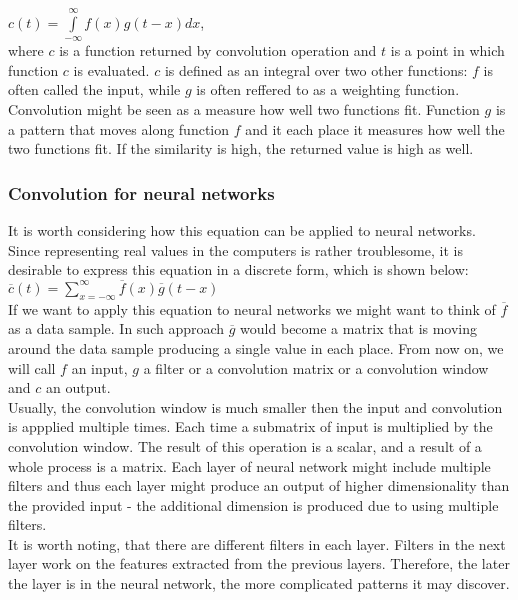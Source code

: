 \documentclass[a4paper,10pt]{report}
\begin{document}
	$c(t) = \int\limits_{-\infty}^\infty f(x)g(t-x)dx$,\\
	
	where $c$ is a function returned by convolution operation and $t$ is a point in which function $c$ is evaluated. $c$ is defined as an integral over two other functions: $f$ is often called the input, while $g$ is often reffered to as a weighting function.\\
	
	Convolution might be seen as a measure how well two functions fit. Function $g$ is a pattern that moves along function $f$ and it each place it measures how well the two functions fit. If the similarity is high, the returned value is high as well. 
		
	\subsubsection{Convolution for neural networks}
	  
	  It is worth considering how this equation can be applied to neural networks. Since representing real values in the computers is rather troublesome, it is desirable to express this equation in a discrete form, which is shown below:\\
	  
	  $\overline{c}(t) = \sum\limits_{x = -\infty}^\infty \overline{f}(x)\overline{g}(t-x)$ \\
	  
	  If we want to apply this equation to neural networks we might want to think of $\overline{f}$ as a data sample. In such approach $\overline{g}$ would become a matrix that is moving around the data sample producing a single value in each place. From now on, we will call $f$ an input, $g$ a filter or a convolution matrix or a convolution window and $c$ an output.\\
	  
	  Usually, the convolution window is much smaller then the input and convolution is appplied multiple times. Each time a  submatrix of input is multiplied by the convolution window. The result of this operation is a scalar, and a result of a whole process is a matrix. Each layer of neural network might include multiple filters and thus each layer might produce an output of higher dimensionality than the provided input - the additional dimension is produced due to using multiple filters.\\
	  
	  It is worth noting, that there are different filters in each layer. Filters in the next layer work on the features extracted from the previous layers. Therefore, the later the layer is in the neural network, the more complicated patterns it may discover.\\
	  
\end{document}
